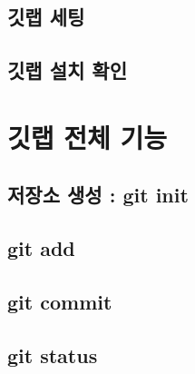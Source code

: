 \documentclass[12pt, a4paper, oneside]{book}
\let\stdsection\section
\renewcommand\section{\newpage\stdsection}
\begin{document}
	\section 	{깃랩 세팅}

%	
	\section 	{깃랩 설치 확인}





	
	\chapter {깃랩 전체 기능 }
	\noptcrule




%	
	\section 	{저장소 생성 :  git init}


%	
	\section 	{git add}


%	
	\section 	{git commit}


%	
	\section 	{git status}
\end{document}
